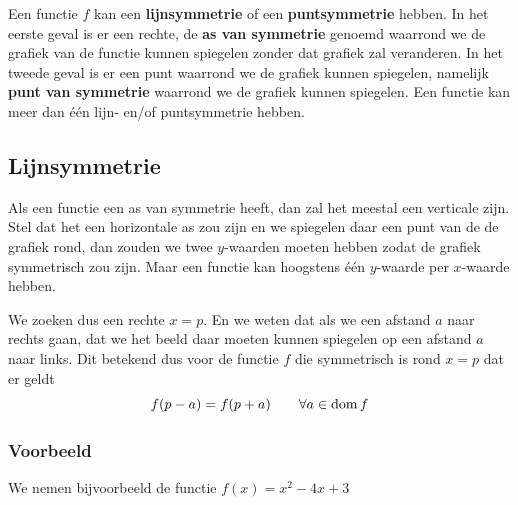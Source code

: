 \documentclass[12pt,twoside]{article}
\begin{document}
\begin{theorie}

Een functie $f$ kan een {\bf lijnsymmetrie} of een {\bf puntsymmetrie} hebben. In het eerste geval is er een rechte, de {\bf as van symmetrie} genoemd waarrond we de grafiek van de functie kunnen spiegelen zonder dat grafiek zal veranderen. In het tweede geval is er een punt waarrond we de grafiek kunnen spiegelen, namelijk {\bf punt van symmetrie} waarrond we de grafiek kunnen spiegelen. Een functie kan meer dan één lijn- en/of puntsymmetrie hebben.

\subsection{Lijnsymmetrie}

Als een functie een as van symmetrie heeft, dan zal het meestal een verticale zijn. Stel dat het een horizontale as zou zijn en we spiegelen daar een punt van de de grafiek rond, dan zouden we twee $y$-waarden moeten hebben zodat de grafiek symmetrisch zou zijn. Maar een functie kan hoogstens één $y$-waarde per $x$-waarde hebben.

We zoeken dus een rechte $x=p$. En we weten dat als we een afstand $a$ naar rechts gaan, dat we het beeld daar moeten kunnen spiegelen op een afstand $a$ naar links. Dit betekend dus voor de functie $f$ die symmetrisch is rond $x=p$ dat er geldt
$$f(p-a)=f(p+a)\qquad\forall a\in \dom f$$

\subsubsection*{Voorbeeld}

We nemen bijvoorbeeld de functie $f(x)=x^2-4x+3$
\begin{center}
\end{center}


\end{theorie}
\end{document}
